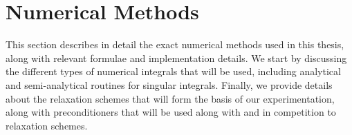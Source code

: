 
\chapter{Numerical Methods}
\label{chapter:methods}
\thispagestyle{myheadings}

\graphicspath{{Numerical_Methods/}}


This section describes in detail the exact numerical methods used in this thesis, along with relevant formulae and implementation details. We start by discussing the different types of numerical integrals that will be used, including analytical and semi-analytical routines for singular integrals. Finally, we provide details about the relaxation schemes that will form the basis of our experimentation, along with preconditioners that will be used along with and in competition to relaxation schemes.



